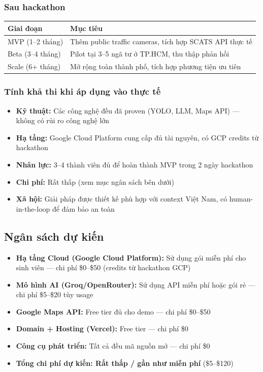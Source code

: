 \documentclass[12pt,a4paper]{article}
\begin{document}
\subsubsection{Sau hackathon}

\begin{table}[ht]
    \centering
    \begin{tabular}{|m{3cm}|m{9.5cm}|}
        \hline
        \textbf{Giai đoạn} & \textbf{Mục tiêu} \\
        \hline
        MVP (1--2 tháng) & Thêm public traffic cameras, tích hợp SCATS API thực tế \\
        \hline
        Beta (3--4 tháng) & Pilot tại 3--5 ngã tư ở TP.HCM, thu thập phản hồi \\
        \hline
        Scale (6+ tháng) & Mở rộng toàn thành phố, tích hợp phương tiện ưu tiên \\
        \hline
    \end{tabular}
\end{table}

\subsubsection{Tính khả thi khi áp dụng vào thực tế}

\begin{itemize}
    \item \textbf{Kỹ thuật:} Các công nghệ đều đã proven (YOLO, LLM, Maps API) — không có rủi ro công nghệ lớn
    \item \textbf{Hạ tầng:} Google Cloud Platform cung cấp đủ tài nguyên, có GCP credits từ hackathon
    \item \textbf{Nhân lực:} 3--4 thành viên đủ để hoàn thành MVP trong 2 ngày hackathon
    \item \textbf{Chi phí:} Rất thấp (xem mục ngân sách bên dưới)
    \item \textbf{Xã hội:} Giải pháp được thiết kế phù hợp với context Việt Nam, có human-in-the-loop để đảm bảo an toàn
\end{itemize}

\subsection{Ngân sách dự kiến}

\begin{itemize}
    \item \textbf{Hạ tầng Cloud (Google Cloud Platform):} Sử dụng gói miễn phí cho sinh viên — chi phí \$0--\$50 (credits từ hackathon GCP)
    \item \textbf{Mô hình AI (Groq/OpenRouter):} Sử dụng API miễn phí hoặc gói rẻ — chi phí \$5--\$20 tùy usage
    \item \textbf{Google Maps API:} Free tier đủ cho demo — chi phí \$0--\$50
    \item \textbf{Domain + Hosting (Vercel):} Free tier — chi phí \$0
    \item \textbf{Công cụ phát triển:} Tất cả đều mã nguồn mở — chi phí \$0
    \item \textbf{Tổng chi phí dự kiến: Rất thấp / gần như miễn phí} (\$5--\$120)
\end{itemize}
\end{document}
